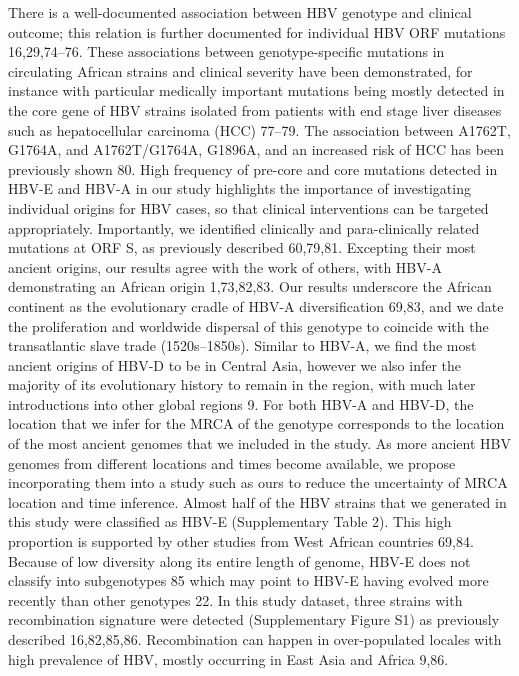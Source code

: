 There is a well-documented association between HBV genotype and clinical outcome; this relation is further documented for individual HBV ORF mutations 16,29,74–76. These associations between genotype-specific mutations in circulating African strains and clinical severity have been demonstrated, for instance with particular medically important mutations being mostly detected in the core gene of HBV strains isolated from patients with end stage liver diseases such as hepatocellular carcinoma (HCC) 77–79. The association between A1762T, G1764A, and A1762T/G1764A, G1896A, and an increased risk of HCC has been previously shown 80. High frequency of pre-core and core mutations detected in HBV-E and HBV-A in our study highlights the importance of investigating individual origins for HBV cases, so that clinical interventions can be targeted appropriately. Importantly, we identified clinically and para-clinically related mutations at ORF S, as previously described 60,79,81.
Excepting their most ancient origins, our results agree with the work of others, with HBV-A demonstrating an African origin 1,73,82,83. Our results underscore the African continent as the evolutionary cradle of HBV-A diversification 69,83, and we date the proliferation and worldwide dispersal of this genotype to coincide with the transatlantic slave trade (1520s–1850s). Similar to HBV-A, we find the most ancient origins of HBV-D to be in Central Asia, however we also infer the majority of its evolutionary history to remain in the region, with much later introductions into other global regions 9. For both HBV-A and HBV-D, the location that we infer for the MRCA of the genotype corresponds to the location of the most ancient genomes that we included in the study. As more ancient HBV genomes from different locations and times become available, we propose incorporating them into a study such as ours to reduce the uncertainty of MRCA location and time inference.
Almost half of the HBV strains that we generated in this study were classified as HBV-E (Supplementary Table 2). This high proportion is supported by other studies from West African countries 69,84. Because of low diversity along its entire length of genome, HBV-E does not classify into subgenotypes 85 which may point to HBV-E having evolved more recently than other genotypes 22. In this study dataset, three strains with recombination signature were detected (Supplementary Figure S1) as previously described 16,82,85,86. Recombination can happen in over-populated locales with high prevalence of HBV, mostly occurring in East Asia and Africa 9,86.
